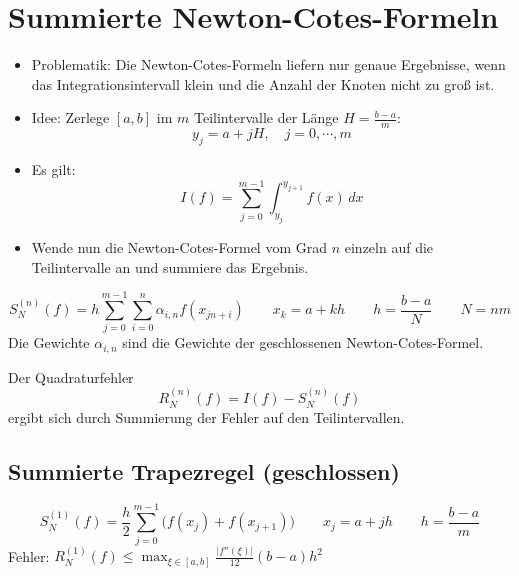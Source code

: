 \documentclass[a4paper, 11pt, accentcolor = tud3b]{tudreport}
\newcommand{\abs}[1]{\ensuremath{{\lvert #1 \rvert}}}
\begin{document}
	    \section{Summierte Newton-Cotes-Formeln}
	        \begin{itemize}
	        	\item Problematik: Die Newton-Cotes-Formeln liefern nur genaue Ergebnisse, wenn das Integrationsintervall klein und die Anzahl der Knoten nicht zu groß ist.
	        	\item Idee: Zerlege \([a,b]\) im \(m\) Teilintervalle der Länge \( H = \frac{b-a}{m} \):
		        	\begin{equation*}
			        	y_j = a + jH, \quad j = 0, \cdots, m
		        	\end{equation*}
		        \item Es gilt:
			        \begin{equation*}
				        I(f) = \sum_{j = 0}^{m-1} \int_{y_j}^{y_{j+1}} \! f(x) \, dx
			        \end{equation*}
			    \item Wende nun die Newton-Cotes-Formel vom Grad \(n\) einzeln auf die Teilintervalle an und summiere das Ergebnis.
	        \end{itemize}
        
	        \begin{equation*}
		        S_N^{(n)} (f) = h \sum_{j = 0}^{m - 1} \sum_{i=0}^{n} \alpha_{i,n} f(x_{jn+i}) \qquad x_k = a + kh \qquad h = \frac{b-a}{N} \qquad N = nm
	        \end{equation*}
	        Die Gewichte \( \alpha_{i,n} \) sind die Gewichte der geschlossenen Newton-Cotes-Formel.
	        
		    Der Quadraturfehler \[ R_N^{(n)} (f) = I(f) - S_N^{(n)} (f) \] ergibt sich durch Summierung der Fehler auf den Teilintervallen.
	
	        \subsection{Summierte Trapezregel (geschlossen)}
	            \begin{equation*}
		            S_N^{(1)} (f) = \frac{h}{2} \sum_{j=0}^{m-1} \big(f(x_j) + f(x_{j+1})\big) \qquad x_j = a + jh \qquad h = \frac{b-a}{m}
	            \end{equation*}
	            Fehler: \( R_N^{(1)} (f) \leq \max_{\xi \in [a, b]} \frac{\abs{f''(\xi)}}{12} (b-a)h^2 \)
	
\end{document}
